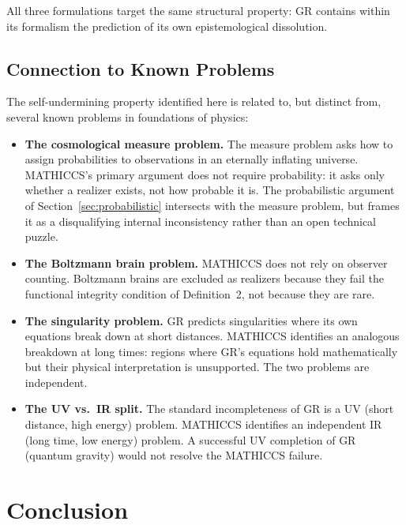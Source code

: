 \documentclass[11pt,a4paper]{article}
\begin{document}
All three formulations target the same structural property: GR contains within its
formalism the prediction of its own epistemological dissolution.

\subsection{Connection to Known Problems}

The self-undermining property identified here is related to, but distinct from,
several known problems in foundations of physics:

\begin{itemize}
\item \textbf{The cosmological measure problem.} The measure problem asks how to
assign probabilities to observations in an eternally inflating universe. MATHICCS's
primary argument does not require probability: it asks only whether a realizer exists,
not how probable it is. The probabilistic argument of Section~\ref{sec:probabilistic}
intersects with the measure problem, but frames it as a disqualifying internal
inconsistency rather than an open technical puzzle.

\item \textbf{The Boltzmann brain problem.} MATHICCS does not rely on observer
counting. Boltzmann brains are excluded as realizers because they fail the functional
integrity condition of Definition~2, not because they are rare.

\item \textbf{The singularity problem.} GR predicts singularities where its own
equations break down at short distances. MATHICCS identifies an analogous breakdown at
long times: regions where GR's equations hold mathematically but their physical
interpretation is unsupported. The two problems are independent.

\item \textbf{The UV vs.\ IR split.} The standard incompleteness of GR is a UV (short
distance, high energy) problem. MATHICCS identifies an independent IR (long time, low
energy) problem. A successful UV completion of GR (quantum gravity) would not resolve
the MATHICCS failure.
\end{itemize}

\section{Conclusion}
\label{sec:conclusion}
\end{document}

